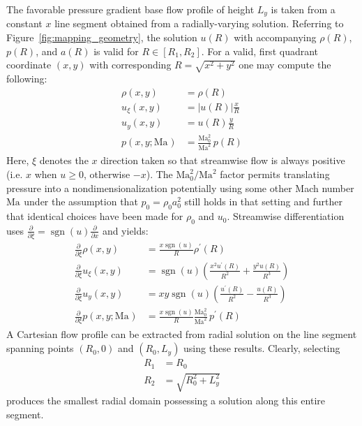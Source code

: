 \documentclass[letterpaper,11pt,nointlimits,reqno]{amsart}
\newcommand{\Mach}[1][]{\mbox{Ma}_{#1}}
\begin{document}
The favorable pressure gradient base flow profile of height $L_y$ is taken from
a constant $x$ line segment obtained from a radially-varying solution.
Referring to Figure~\eqref{fig:mapping_geometry}, the solution
$u\!\left(R\right)$ with accompanying $\rho\!\left(R\right)$,
$p\!\left(R\right)$, and $a\!\left(R\right)$ is valid for
$R\in\left[R_1,R_2\right]$.  For a valid, first quadrant coordinate
$\left(x,y\right)$ with corresponding $R=\sqrt{x^2+y^2}$ one may compute the
following:
%
\begin{align}
    \rho \!\left(x, y\right) &= \rho\!\left(R\right)
\\  u_\xi\!\left(x, y\right) &= \left|u\!\left(R\right)\right| \frac{x}{R}
\\  u_y  \!\left(x, y\right) &=       u\!\left(R\right)        \frac{y}{R}
\\  p    \!\left(x, y; \Mach\right) &= \frac{\Mach[0]^2}{\Mach^2} \, p\!\left(R\right)
\end{align}
%
Here, $\xi$ denotes the $x$ direction taken so that streamwise flow is always
positive (i.e. $x$ when $u\geq{}0$, otherwise $-x$).  The $\Mach[0]^2/\Mach^2$
factor permits translating pressure into a nondimensionalization potentially
using some other Mach number $\Mach$ under the assumption that $p_0 = \rho_0
a_0^2$ still holds in that setting and further that identical choices have been
made for $\rho_0$ and $u_0$.
%
Streamwise differentiation uses $\frac{\partial}{\partial\xi} =
\operatorname{sgn}(u) \frac{\partial}{\partial{}x}$ and yields:
%
\begin{align}
  \frac{\partial}{\partial\xi} \rho \!\left(x, y\right)
&=
  \frac{x\operatorname{sgn}(u)}{R} \rho^\prime\!\left(R\right)
\\
  \frac{\partial}{\partial\xi} u_\xi\!\left(x, y\right)
&=
  \operatorname{sgn}(u) \left(
      \frac{x^2 u^\prime\!\left(R\right)}{R^2}
    + \frac{y^2 u       \!\left(R\right)}{R^3}
  \right)
\\
  \frac{\partial}{\partial\xi} u_y  \!\left(x, y\right)
&=
  x y \operatorname{sgn}(u) \left(
      \frac{u^\prime\!\left(R\right)}{R^2}
    - \frac{u       \!\left(R\right)}{R^3}
  \right)
\\
  \frac{\partial}{\partial\xi} p    \!\left(x, y; \Mach\right)
&=
  \frac{x\operatorname{sgn}(u)}{R}
  \frac{\Mach[0]^2}{\Mach^2}
  \,
  p^\prime\!\left(R\right)
\end{align}
%
A Cartesian flow profile can be extracted from radial solution on the line
segment spanning points $\left(R_0,0\right)$ and $\left(R_0,L_y\right)$ using
these results.  Clearly, selecting
\begin{align}
  R_1 &= R_0
\\
  R_2 &= \sqrt{R_0^2 + L_y^2}
\end{align}
produces the smallest radial domain possessing a solution along this entire
segment.
\end{document}

